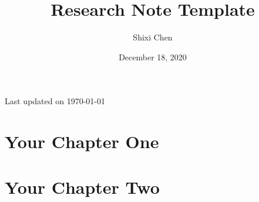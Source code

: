 \documentclass[11pt,oneside]{book}
\title{Research Note Template}
\author{Shixi Chen}
\date{December 18, 2020}
\newcommand{\updateinfo}[1][\today]{\par\vfill\hfill{\scriptsize\color{gray}Last updated on #1}}
\begin{document}



{}
\tableofcontents
\updateinfo


\chapter{Your Chapter One}



\chapter{Your Chapter Two}


\end{document}
